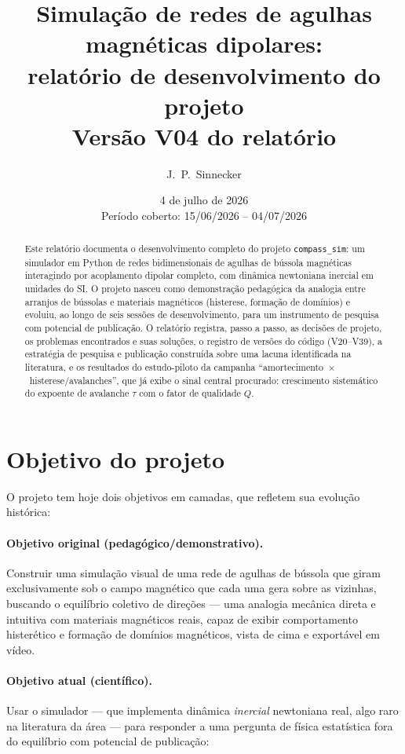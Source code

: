 \documentclass[11pt,a4paper]{article}
\title{\textbf{Simulação de redes de agulhas magnéticas dipolares:\\
relatório de desenvolvimento do projeto \code{compass\_sim}}\\[1ex]
\large Versão V04 do relatório}
\author{J.~P.~Sinnecker}
\date{4 de julho de 2026\\[0.5ex]
\small Período coberto: 15/06/2026 -- 04/07/2026}
\newcommand{\code}[1]{\texttt{#1}}
\begin{document}
\maketitle

\begin{abstract}
\noindent
Este relatório documenta o desenvolvimento completo do projeto
\code{compass\_sim}: um simulador em Python de redes bidimensionais de
agulhas de bússola magnéticas interagindo por acoplamento dipolar
completo, com dinâmica newtoniana inercial em unidades do SI. O projeto
nasceu como demonstração pedagógica da analogia entre arranjos de
bússolas e materiais magnéticos (histerese, formação de domínios) e
evoluiu, ao longo de seis sessões de desenvolvimento, para um
instrumento de pesquisa com potencial de publicação. O relatório
registra, passo a passo, as decisões de projeto, os problemas
encontrados e suas soluções, o registro de versões do código
(V20--V39), a estratégia de pesquisa e publicação construída sobre uma
lacuna identificada na literatura, e os resultados do estudo-piloto da
campanha ``amortecimento~$\times$~histerese/avalanches'', que já exibe o
sinal central procurado: crescimento sistemático do expoente de
avalanche $\tau$ com o fator de qualidade $Q$.
\end{abstract}

\tableofcontents
\newpage

\section{Objetivo do projeto}

O projeto tem hoje dois objetivos em camadas, que refletem sua evolução
histórica:

\paragraph{Objetivo original (pedagógico/demonstrativo).}
Construir uma simulação visual de uma rede de agulhas de bússola que
giram exclusivamente sob o campo magnético que cada uma gera sobre as
vizinhas, buscando o equilíbrio coletivo de direções --- uma analogia
mecânica direta e intuitiva com materiais magnéticos reais, capaz de
exibir comportamento histerético e formação de domínios magnéticos,
vista de cima e exportável em vídeo.

\paragraph{Objetivo atual (científico).}
Usar o simulador --- que implementa dinâmica \emph{inercial} newtoniana
real, algo raro na literatura da área --- para responder a uma pergunta
de física estatística fora do equilíbrio com potencial de publicação:
\end{document}
